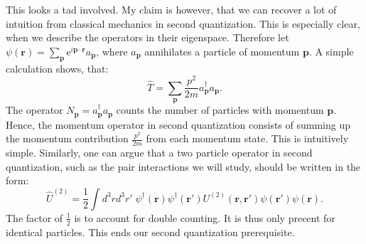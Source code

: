 This looks a tad involved. My claim is however, that we can recover a lot of intuition from classical mechanics in second quantization. This is especially clear, when we describe the operators in their eigenspace. Therefore let $\psi(\mathbf{r}) = \sum_{\mathbf{p}} \text{e}^{i\mathbf{p}\cdot \mathbf{r}} a_\mathbf{p}$, where $a_\mathbf{p}$ annihilates a particle of momentum $\mathbf{p}$. A simple calculation shows, that:
\begin{equation}
\hat{T} = \sum_\mathbf{p} \frac{p^2}{2m} a^\dagger_\mathbf{p}a_\mathbf{p}.
\end{equation}
The operator $N_\mathbf{p} = a^\dagger_\mathbf{p}a_\mathbf{p}$ counts the number of particles with momentum $\mathbf{p}$. Hence, the momentum operator in second quantization consists of summing up the momentum contribution $\frac{p^2}{2m}$ from each momentum state. This is intuitively simple. Similarly, one can argue that a two particle operator in second quantization, such as the pair interactions we will study, should be written in the form:
\begin{equation}
\hat{U}^{(2)} = \frac{1}{2}\int d^3 r d^3 r' \; \psi^\dagger(\mathbf{r}) \psi^\dagger(\mathbf{r}') U^{(2)}(\mathbf{r},\mathbf{r}')\psi(\mathbf{r}')\psi(\mathbf{r}). 
\label{eq.InteractionHamiltonain2ndQuantization} 
\end{equation}
The factor of $\frac{1}{2}$ is to account for double counting. It is thus only precent for identical particles. This ends our second quantization prerequisite. 



